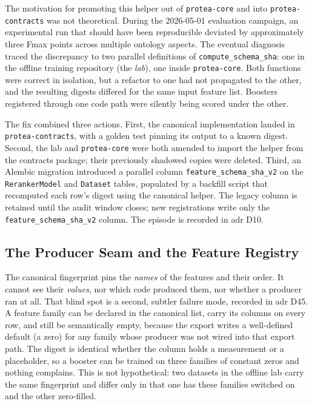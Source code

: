 The motivation for promoting this helper out of \texttt{protea-core} and
into \texttt{protea-contracts} was not theoretical. During the
2026-05-01 evaluation campaign, an experimental run that should have been
reproducible deviated by approximately three Fmax points across multiple
ontology aspects. The eventual diagnosis traced the discrepancy to two
parallel definitions of \texttt{compute\_schema\_sha}: one in the offline
training repository (the \textit{lab}), one inside \texttt{protea-core}.
Both functions were correct in isolation, but a refactor to one had not
propagated to the other, and the resulting digests differed for the same
input feature list. Boosters registered through one code path were
silently being scored under the other.

The fix combined three actions. First, the canonical implementation
landed in \texttt{protea-contracts}, with a golden test pinning its output
to a known digest. Second, the lab and \texttt{protea-core} were both
amended to import the helper from the contracts package; their previously
shadowed copies were deleted. Third, an Alembic migration introduced a
parallel column \texttt{feature\_schema\_sha\_v2} on the
\texttt{RerankerModel} and \texttt{Dataset} tables, populated by a
backfill script that recomputed each row's digest using the canonical
helper. The legacy column is retained until the audit window closes; new
registrations write only the \texttt{feature\_schema\_sha\_v2} column. The episode is recorded in
\gls{adr} D10.

\subsection{The Producer Seam and the Feature Registry}
\label{subsec:feature-registry}

The canonical fingerprint pins the \emph{names} of the features and their
order. It cannot see their \emph{values}, nor which code produced them,
nor whether a producer ran at all. That blind spot is a second, subtler
failure mode, recorded in \gls{adr} D45. A feature family can be declared
in the canonical list, carry its columns on every row, and still be
semantically empty, because the export writes a well-defined default (a
zero) for any family whose producer was not wired into that export path.
The digest is identical whether the column holds a measurement or a
placeholder, so a booster can be trained on three families of constant
zeros and nothing complains. This is not hypothetical: two datasets in
the offline lab carry the same fingerprint and differ only in that one
has these families switched on and the other zero-filled.

